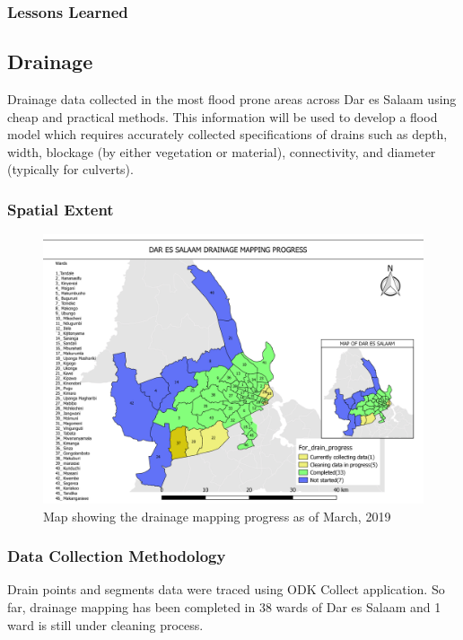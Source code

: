 \documentclass[a4paper,12pt,twoside]{article}
\begin{document}
\subsubsection{Lessons Learned}

\newpage
\subsection{Drainage}
Drainage data collected in the most flood prone areas across Dar es Salaam using cheap  and practical methods. This information will be used to develop a flood model which requires accurately collected specifications of drains such as depth, width, blockage (by either vegetation or material), connectivity, and diameter (typically for culverts).

\subsubsection{Spatial Extent}
\begin{figure}[h]
  \color{RHgreen}\caption{Map showing the drainage mapping progress as of March, 2019}
  \centering
  \includegraphics[width=1\textwidth]{images/Dar_drainage_mapping_progress.png}
\end{figure}

\subsubsection{Data Collection Methodology}

Drain points and segments data were traced using ODK Collect application. So far, drainage mapping has been completed in 38 wards of Dar es Salaam and 1 ward is still under cleaning process.
\end{document}
